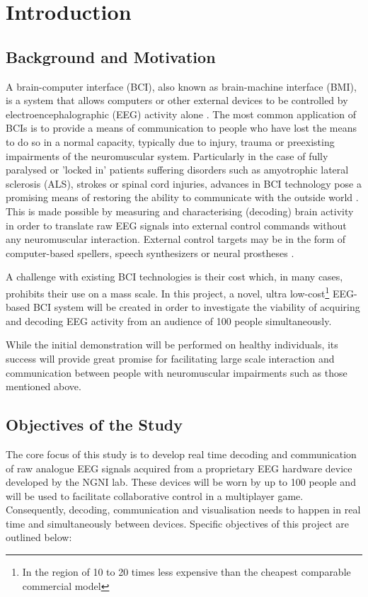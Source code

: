 \chapter{Introduction}
\label{chapter:introduction}

\graphicspath{ {report/Chapter1/assets/} } 

\section{Background and Motivation}

A brain-computer interface (BCI), also known as brain-machine interface (BMI), is a system that allows computers or other external devices to be controlled by electroencephalographic (EEG) activity alone \cite{bci-survey-nicolas-alonso}. The most common application of BCIs is to provide a means of communication to people who have lost the means to do so in a normal capacity, typically due to injury, trauma or preexisting impairments of the neuromuscular system. Particularly in the case of fully paralysed or 'locked in' patients suffering disorders such as amyotrophic lateral sclerosis (ALS), strokes or spinal cord injuries, advances in BCI technology pose a promising means of restoring the ability to communicate with the outside world \cite{bci-wolpaw}. This is made possible by measuring and characterising (decoding) brain activity in order to translate raw EEG signals into external control commands without any neuromuscular interaction. External control targets may be in the form of computer-based spellers, speech synthesizers or neural prostheses \cite{bci-survey-nicolas-alonso}. 

A challenge with existing BCI technologies is their cost which, in many cases, prohibits their use on a mass scale. In this project, a novel, ultra low-cost\footnote{In the region of 10 to 20 times less expensive than the cheapest comparable commercial model} EEG-based BCI system will be created in order to investigate the viability of acquiring and decoding EEG activity from an audience of 100 people simultaneously. 

While the initial demonstration will be performed on healthy individuals, its success will provide great promise for facilitating large scale interaction and communication between people with neuromuscular impairments such as those mentioned above.  

\section{Objectives of the Study}
The core focus of this study is to develop real time decoding and communication of raw analogue EEG signals acquired from a proprietary EEG hardware device developed by the NGNI lab. These devices will be worn by up to 100 people and will be used to facilitate collaborative control in a multiplayer game. Consequently, decoding, communication and visualisation needs to happen in real time and simultaneously between devices. Specific objectives of this project are outlined below:

